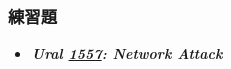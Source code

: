 \subsubsection*{練習題}
\begin{itemize}[label={\Checkmark}]
\item \textbf{\textit{Ural \href{http://acm.timus.ru/problem.aspx?num=1557}{1557}: Network Attack}}\\

\end{itemize}